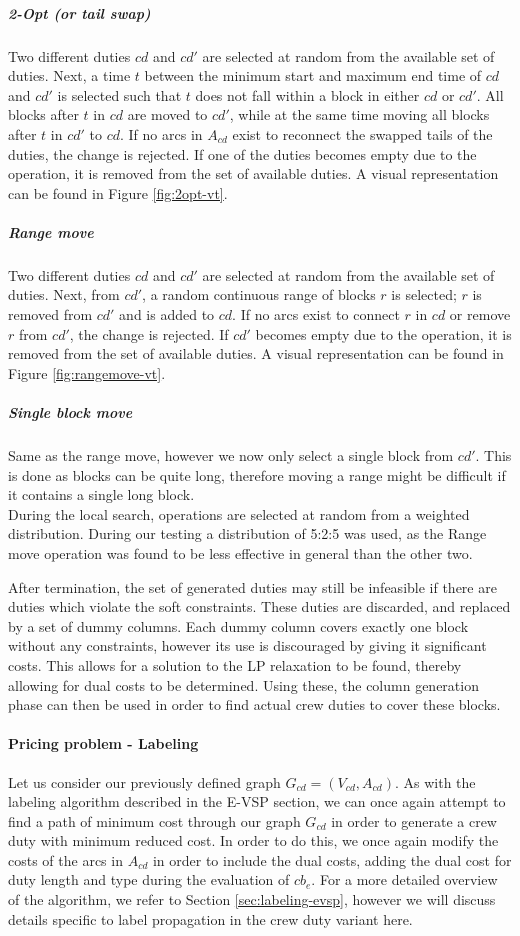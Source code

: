 \documentclass[]{article}
\begin{document}
\noindent\subparagraph{2-Opt (or tail swap)} Two different duties $cd$ and $cd'$ are selected at random from the available set of duties. Next, a time $t$ between the minimum start and maximum end time of $cd$ and $cd'$ is selected such that $t$ does not fall within a block in either $cd$ or $cd'$. All blocks after $t$ in $cd$ are moved to $cd'$, while at the same time moving all blocks after $t$ in $cd'$ to $cd$. If no arcs in $A_{cd}$ exist to reconnect the swapped tails of the duties, the change is rejected. If one of the duties becomes empty due to the operation, it is removed from the set of available duties. A visual representation can be found in Figure \ref{fig:2opt-vt}.
\noindent\subparagraph{Range move} Two different duties $cd$ and $cd'$ are selected at random from the available set of duties. Next, from $cd'$, a random continuous range of blocks $r$ is selected; $r$ is removed from $cd'$ and is added to $cd$. If no arcs exist to connect $r$ in $cd$ or remove $r$ from $cd'$, the change is rejected. If $cd'$ becomes empty due to the operation, it is removed from the set of available duties. A visual representation can be found in Figure \ref{fig:rangemove-vt}.
\noindent\subparagraph{Single block move} Same as the range move, however we now only select a single block from $cd'$. This is done as blocks can be quite long, therefore moving a range might be difficult if it contains a single long block. \\

\noindent During the local search, operations are selected at random from a weighted distribution. During our testing a distribution of 5:2:5 was used, as the Range move operation was found to be less effective in general than the other two.

After termination, the set of generated duties may still be infeasible if there are duties which violate the soft constraints. These duties are discarded, and replaced by a set of dummy columns. Each dummy column covers exactly one block without any constraints, however its use is discouraged by giving it significant costs. This allows for a solution to the LP relaxation to be found, thereby allowing for dual costs to be determined. Using these, the column generation phase can then be used in order to find actual crew duties to cover these blocks.

\paragraph{Pricing problem - Labeling}
Let us consider our previously defined graph $G_{cd} = (V_{cd}, A_{cd})$. As with the labeling algorithm described in the E-VSP section, we can once again attempt to find a path of minimum cost through our graph $G_{cd}$ in order to generate a crew duty with minimum reduced cost. In order to do this, we once again modify the costs of the arcs in $A_{cd}$ in order to include the dual costs, adding the dual cost for duty length and type during the evaluation of $cb_e$. For a more detailed overview of the algorithm, we refer to Section \ref{sec:labeling-evsp}, however we will discuss details specific to label propagation in the crew duty variant here. 
\end{document}
